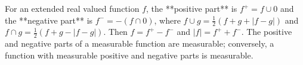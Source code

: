 For an extended real valued function $f$, the **positive part** is $f^+ = f \cup 0$ and the **negative part** is $f^- = -(f \cap 0)$, where $f \cup g = \frac{1}{2}(f + g + |f - g|)$ and $f \cap g = \frac{1}{2}(f + g - |f - g|)$. Then $f = f^+ - f^-$ and $|f| = f^+ + f^-$. The positive and negative parts of a measurable function are measurable; conversely, a function with measurable positive and negative parts is measurable.
